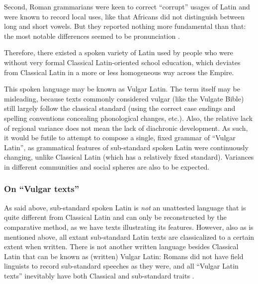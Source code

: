 \documentclass[a4paper, oneside, 12pt]{report}
\newcommand*{\citepage}[1]{p.~{#1}}
\newcommand*{\citepages}[1]{pp.~{#1}}
\begin{document}
Second, Roman grammarians were keen to correct ``corrupt'' usages of Latin 
and were known to record local uses, 
like that Africans did not distinguish between long and short vowels.
But they reported nothing more fundamental than that:
the most notable differences seemed to be pronunciation
\citep[\citepage{118}]{herman2010vulgar}.

Therefore, there existed a spoken variety of Latin used by people who were without very formal Classical Latin-oriented school education,
which deviates from Classical Latin in a more or less homogeneous way across the Empire.

This spoken language may be known as Vulgar Latin.
The term itself may be misleading, because texts commonly considered vulgar (like the Vulgate Bible) still largely follow the classical standard (using the correct case endings and spelling conventions concealing phonological changes, etc.).
Also, the relative lack of regional variance does not mean the lack of diachronic development.
As such, it would be futile to attempt to compose a single, fixed grammar of ``Vulgar Latin'', 
as grammatical features of sub-standard spoken Latin were continuously changing,
unlike Classical Latin (which has a relatively fixed standard).
Variances in different communities and social spheres are also to be expected.

\subsubsection{On ``Vulgar texts''}\label{sec:introduction.history.vulgar-text}

As said above, sub-standard spoken Latin is \emph{not} an unattested language that is quite different from Classical Latin and can only be reconstructed by the comparative method,
as we have texts illustrating its features.
However, also as is mentioned above, all extant sub-standard Latin texts are classicalized to a certain extent when written.
There is not another written language besides Classical Latin that can be known as (written) Vulgar Latin:
Romans did not have field linguists to record sub-standard speeches as they were,
and all ``Vulgar Latin texts'' inevitably have both Classical and sub-standard traits
\citep[\citepages{8,26}]{herman2010vulgar}.
\end{document}
